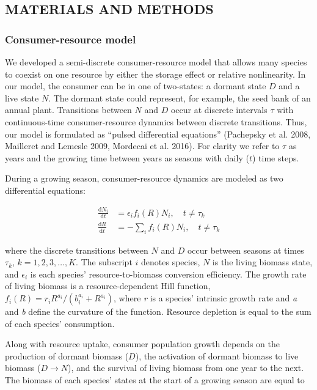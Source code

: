 \documentclass[12pt,]{article}
\begin{document}
\subsection{MATERIALS AND METHODS}\label{materials-and-methods}

\subsubsection{Consumer-resource model}\label{consumer-resource-model}

We developed a semi-discrete consumer-resource model that allows many
species to coexist on one resource by either the storage effect or
relative nonlinearity. In our model, the consumer can be in one of
two-states: a dormant state \(D\) and a live state \(N\). The dormant
state could represent, for example, the seed bank of an annual plant.
Transitions between \(N\) and \(D\) occur at discrete intervals \(\tau\)
with continuous-time consumer-resource dynamics between discrete
transitions. Thus, our model is formulated as ``pulsed differential
equations'' (Pachepsky et al. 2008, Mailleret and Lemesle 2009, Mordecai
et al. 2016). For clarity we refer to \(\tau\) as years and the growing
time between years as seasons with daily (\(t\)) time steps.

During a growing season, consumer-resource dynamics are modeled as two
differential equations: \vspace{-3em}

\begin{align}
\frac{\text{d}N_{i}}{\text{d}t} &= \epsilon_if_{i}(R)N_{i}, \quad t \ne \tau_k\\
\frac{\text{d}R}{\text{d}t} &= - \sum\limits_{i}f_{i}(R)N_{i}, \quad t \ne \tau_k
\end{align}\vspace{-3em}

\noindent where the discrete transitions between \(N\) and \(D\) occur
between seasons at times \(\tau_k\), \(k = 1,2,3, \dots, K\). The
subscript \(i\) denotes species, \(N\) is the living biomass state, and
\(\epsilon_i\) is each species' resource-to-biomass conversion
efficiency. The growth rate of living biomass is a resource-dependent
Hill function,
\(f_{i}(R) = r_{i}R^{a_{i}} / (b_{i}^{a_{i}}+R^{a_{i}})\), where
\emph{r} is a species' intrinsic growth rate and \emph{a} and \emph{b}
define the curvature of the function. Resource depletion is equal to the
sum of each species' consumption.

Along with resource uptake, consumer population growth depends on the
production of dormant biomass (\(D\)), the activation of dormant biomass
to live biomass (\(D \rightarrow N\)), and the survival of living
biomass from one year to the next. The biomass of each species' states
at the start of a growing season are equal to \vspace{-3em}
\end{document}
